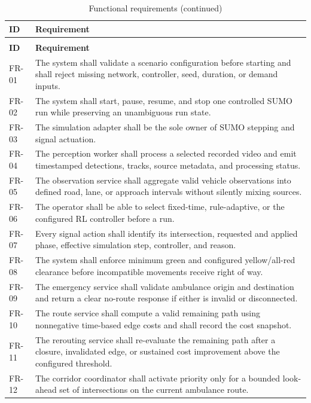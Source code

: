 \begin{longtable}{p{}p{}}
\caption{Functional requirements}\label{tab:functional-requirements}\\
\toprule
\textbf{ID} & \textbf{Requirement}\\
\midrule\endfirsthead
\caption[]{Functional requirements (continued)}\\
\toprule
\textbf{ID} & \textbf{Requirement}\\
\midrule\endhead
FR-01 & The system shall validate a scenario configuration before starting and shall reject missing network, controller, seed, duration, or demand inputs.\\
FR-02 & The system shall start, pause, resume, and stop one controlled SUMO run while preserving an unambiguous run state.\\
FR-03 & The simulation adapter shall be the sole owner of SUMO stepping and signal actuation.\\
FR-04 & The perception worker shall process a selected recorded video and emit timestamped detections, tracks, source metadata, and processing status.\\
FR-05 & The observation service shall aggregate valid vehicle observations into defined road, lane, or approach intervals without silently mixing sources.\\
FR-06 & The operator shall be able to select fixed-time, rule-adaptive, or the configured RL controller before a run.\\
FR-07 & Every signal action shall identify its intersection, requested and applied phase, effective simulation step, controller, and reason.\\
FR-08 & The system shall enforce minimum green and configured yellow/all-red clearance before incompatible movements receive right of way.\\
FR-09 & The emergency service shall validate ambulance origin and destination and return a clear no-route response if either is invalid or disconnected.\\
FR-10 & The route service shall compute a valid remaining path using nonnegative time-based edge costs and shall record the cost snapshot.\\
FR-11 & The rerouting service shall re-evaluate the remaining path after a closure, invalidated edge, or sustained cost improvement above the configured threshold.\\
FR-12 & The corridor coordinator shall activate priority only for a bounded look-ahead set of intersections on the current ambulance route.\\

\end{longtable}
